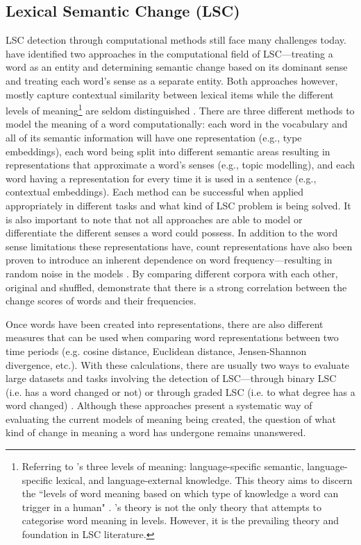 \subsection{Lexical Semantic Change (LSC)}

LSC detection through computational methods still face many challenges today. \citet{hengchen2021challenges} have identified two approaches in the computational field of LSC—treating a word as an entity and determining semantic change based on its dominant sense and treating each word’s sense as a separate entity. Both approaches however, mostly capture contextual similarity between lexical items while the different levels of meaning\footnote{Referring to \citet{blank1997prinzipien}'s three levels of meaning: language-specific semantic, language-specific lexical, and language-external knowledge. This theory aims to discern the ``levels of word meaning based on which type of knowledge a word can trigger in a human" \citep{hengchen2021challenges}. \citet{blank1997prinzipien}'s theory is not the only theory that attempts to categorise word meaning in levels. However, it is the prevailing theory and foundation in LSC literature.} are seldom distinguished \citep{hengchen2021challenges}. There are three different methods to model the meaning of a word computationally: each word in the vocabulary and all of its semantic information will have one representation (e.g., type embeddings), each word being split into different semantic areas resulting in representations that approximate a word’s senses (e.g., topic modelling), and each word having a representation for every time it is used in a sentence (e.g., contextual embeddings). Each method can be successful when applied appropriately in different tasks and what kind of LSC problem is being solved. It is also important to note that not all approaches are able to model or differentiate the different senses a word could possess. In addition to the word sense limitations these representations have, count representations have also been proven to introduce an inherent dependence on word frequency—resulting in random noise in the models \citep{dubossarsky-etal-2017-outta}. By comparing different corpora with each other, original and shuffled, \citet{dubossarsky-etal-2017-outta} demonstrate that there is a strong correlation between the change scores of words and their frequencies. 

Once words have been created into representations, there are also different measures that can be used when comparing word representations between two time periods (e.g. cosine distance, Euclidean distance, Jensen-Shannon divergence, etc.). With these calculations, there are usually two ways to evaluate large datasets and tasks involving the detection of LSC—through binary LSC (i.e. has a word changed or not) or through graded LSC (i.e. to what degree has a word changed) \citep{schlectwegschulte2020}. Although these approaches present a systematic way of evaluating the current models of meaning being created, the question of what kind of change in meaning a word has undergone remains unanswered.

